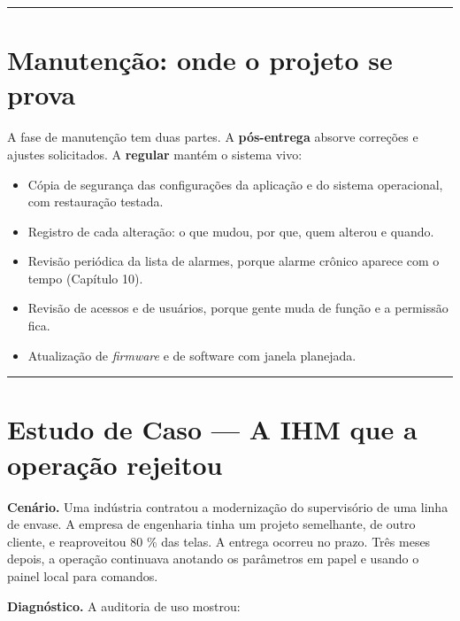 \begin{center}\rule{0.5\linewidth}{0.5pt}\end{center}

\section{Manutenção: onde o projeto se prova}\label{manutenuxe7uxe3o-onde-o-projeto-se-prova}

A fase de manutenção tem duas partes. A \textbf{pós-entrega} absorve correções e ajustes solicitados. A
\textbf{regular} mantém o sistema vivo:

\begin{itemize}
\tightlist
\item
  Cópia de segurança das configurações da aplicação e do sistema operacional, com restauração testada.
\item
  Registro de cada alteração: o que mudou, por que, quem alterou e quando.
\item
  Revisão periódica da lista de alarmes, porque alarme crônico aparece com o tempo (Capítulo 10).
\item
  Revisão de acessos e de usuários, porque gente muda de função e a permissão fica.
\item
  Atualização de \emph{firmware} e de software com janela planejada.
\end{itemize}

\begin{center}\rule{0.5\linewidth}{0.5pt}\end{center}

\section{\texorpdfstring{Estudo de Caso --- A IHM que a operação rejeitou}{Estudo de Caso  A IHM que a operação rejeitou}}\label{estudo-de-caso-a-ihm-que-a-operauxe7uxe3o-rejeitou}

\textbf{Cenário.} Uma indústria contratou a modernização do supervisório de uma linha de envase. A empresa
de engenharia tinha um projeto semelhante, de outro cliente, e reaproveitou 80 \% das telas. A entrega
ocorreu no prazo. Três meses depois, a operação continuava anotando os parâmetros em papel e usando o
painel local para comandos.

\textbf{Diagnóstico.} A auditoria de uso mostrou:

